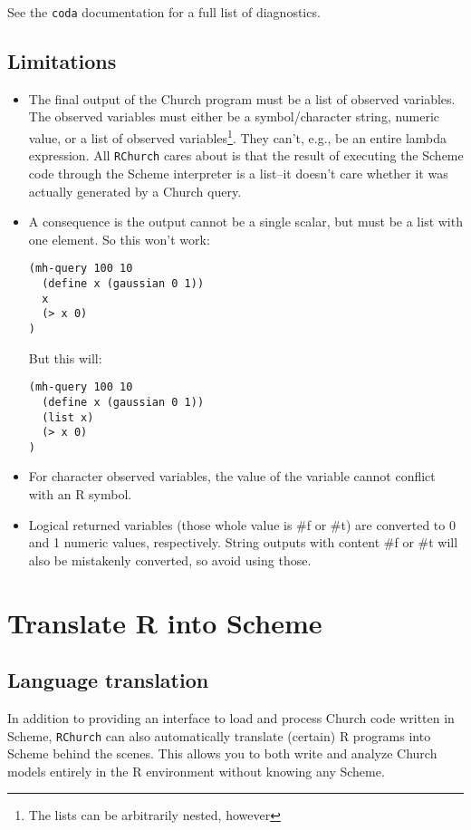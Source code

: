 \documentclass[12pt]{article}
\newcommand{\rchurch}{\texttt{RChurch}\xspace}
\newcommand{\church}{Church\xspace}
\begin{document}
See the \texttt{coda} documentation for a full list of diagnostics.


\subsection{Limitations}
\begin{itemize}
\item The final output of the \church program must be a list of observed variables. The observed variables must either be a symbol/character string, numeric value, or a list of observed variables\footnote{The lists can be arbitrarily nested, however}. They can't, e.g., be an entire lambda expression. All \rchurch cares about is that the result of executing the Scheme code through the Scheme interpreter is a list--it doesn't care whether it was actually generated by a \church query.
\item A consequence is the output cannot be a single scalar, but must be a list with one element. So this won't work:
\begin{lstlisting}
(mh-query 100 10
  (define x (gaussian 0 1))
  x
  (> x 0)
)
\end{lstlisting}
But this will:
\begin{lstlisting}
(mh-query 100 10
  (define x (gaussian 0 1))
  (list x)
  (> x 0)
)
\end{lstlisting}
\item For character observed variables, the value of the variable cannot conflict with an R symbol.
\item Logical returned variables (those whole value is \#f or \#t) are converted to 0 and 1 numeric values, respectively. String outputs with content \#f or \#t will also be mistakenly converted, so avoid using those.
\end{itemize}

\section{Translate R into Scheme}
\subsection{Language translation}
In addition to providing an interface to load and process \church code written in Scheme, \rchurch can also automatically translate (certain) R programs into Scheme behind the scenes. This allows you to both write and analyze \church models entirely in the R environment without knowing any Scheme. 
\end{document}
